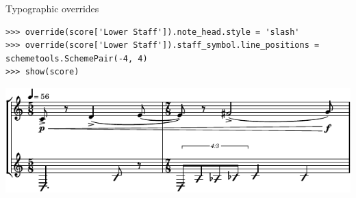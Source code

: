 \begin{frame}[fragile]{Typographic overrides}

\begin{abjadbookoutput}
\begin{singlespacing}
\vspace{-0.5\baselineskip}
\begin{verbatim}
>>> override(score['Lower Staff']).note_head.style = 'slash'
>>> override(score['Lower Staff']).staff_symbol.line_positions = schemetools.SchemePair(-4, 4)
>>> show(score)
\end{verbatim}
\noindent\includegraphics[max width=\textwidth,]{assets/lilypond-4fd5d30f6d67e7dc95e18808899f5ad9.pdf}
\end{singlespacing}
\end{abjadbookoutput}

\end{frame}

